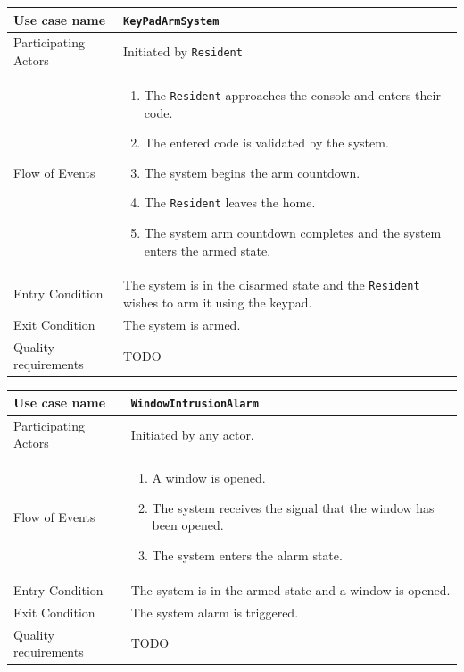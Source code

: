 \documentclass{report}
\begin{document}
\begin{tabular}{| l | p{12cm} |}
\hline
Use case name & \texttt{KeyPadArmSystem} \\ \hline
Participating Actors & Initiated by \texttt{Resident} \\ \hline
Flow of Events & 

\begin{enumerate}
 \item The \texttt{Resident} approaches the console and enters their code.
 \item The entered code is validated by the system.
 \item The system begins the arm countdown.
 \item The \texttt{Resident} leaves the home.
 \item The system arm countdown completes and the system enters the armed state.
\end{enumerate}

\\ \hline

Entry Condition & The system is in the disarmed state and the \texttt{Resident}
    wishes to arm it using the keypad. \\ \hline
Exit Condition & The system is armed. \\ \hline
Quality requirements & TODO \\ \hline

\hline
\end{tabular}

\begin{tabular}{| l | p{12cm} |}
\hline
Use case name & \texttt{WindowIntrusionAlarm} \\ \hline
Participating Actors & Initiated by any actor. \\ \hline
Flow of Events & 

\begin{enumerate}
 \item A window is opened.
 \item The system receives the signal that the window has been opened.
 \item The system enters the alarm state.
\end{enumerate}

\\ \hline

Entry Condition & The system is in the armed state and a window is opened. \\ 
\hline
Exit Condition & The system alarm is triggered. \\ \hline
Quality requirements & TODO \\ \hline

\hline
\end{tabular}
\end{document}
